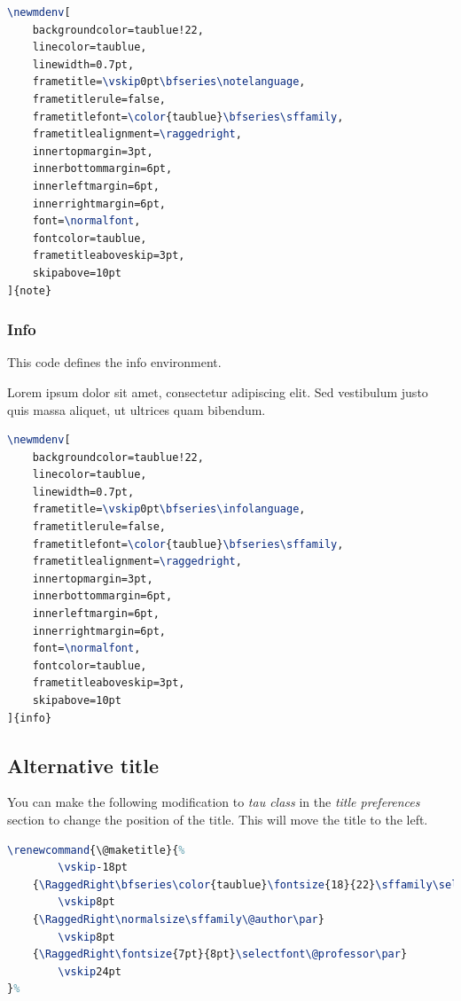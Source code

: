 \documentclass[9pt,a4paper,twoside]{tau}
\begin{document}
\begin{lstlisting}[language=TeX, caption=Note environment code.]
\newmdenv[
	backgroundcolor=taublue!22, 						
	linecolor=taublue,									
	linewidth=0.7pt,
	frametitle=\vskip0pt\bfseries\notelanguage,
	frametitlerule=false,
	frametitlefont=\color{taublue}\bfseries\sffamily,
	frametitlealignment=\raggedright,
	innertopmargin=3pt,
	innerbottommargin=6pt,
	innerleftmargin=6pt,
	innerrightmargin=6pt,
	font=\normalfont,
	fontcolor=taublue,									
	frametitleaboveskip=3pt,
	skipabove=10pt
]{note} \end{lstlisting}

		\subsubsection{Info}

                This code defines the info environment.

    		\begin{info}
                    Lorem ipsum dolor sit amet, consectetur adipiscing elit. Sed vestibulum justo quis massa aliquet, ut ultrices quam bibendum.
			\end{info}
		
\begin{lstlisting}[language=TeX, caption=Info environment code.]
\newmdenv[
	backgroundcolor=taublue!22, 						
	linecolor=taublue,									
	linewidth=0.7pt,
	frametitle=\vskip0pt\bfseries\infolanguage,
	frametitlerule=false,
	frametitlefont=\color{taublue}\bfseries\sffamily,
	frametitlealignment=\raggedright,
	innertopmargin=3pt,
	innerbottommargin=6pt,
	innerleftmargin=6pt,
	innerrightmargin=6pt,
	font=\normalfont,
	fontcolor=taublue,									
	frametitleaboveskip=3pt,
	skipabove=10pt
]{info} \end{lstlisting}

    \subsection{Alternative title}

         You can make the following modification to \textit{tau class} in the \textit{title preferences} section to change the position of the title. This will move the title to the left. 

\begin{lstlisting}[language=TeX, caption=Alternative title.]
\renewcommand{\@maketitle}{%
        \vskip-18pt
    {\RaggedRight\bfseries\color{taublue}\fontsize{18}{22}\sffamily\selectfont\@title\par}
		\vskip8pt
    {\RaggedRight\normalsize\sffamily\@author\par}
        \vskip8pt
    {\RaggedRight\fontsize{7pt}{8pt}\selectfont\@professor\par}
        \vskip24pt
}% 
\end{lstlisting}
\end{document}
